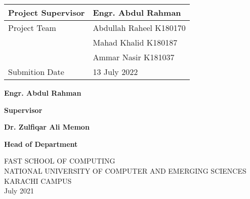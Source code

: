 \begin{titlepage}
    \begin{center}
        \vspace*{1cm}

        \begin{tabular}{ | m{5cm} | m{5cm} | }
            \hline
            Project Supervisor & \textbf{Engr. Abdul Rahman} \\ [1.5ex] 
            \hline
            Project Team & Abdullah Raheel K180170 \\ [1.5ex] 
             & Mahad Khalid K180187 \\ [1.5ex] 
             & Ammar Nasir K181037 \\ [1.5ex] 
            \hline
            Submition Date & 13 July 2022 \\ [1.5ex]
            \hline

          \end{tabular}

        \vspace{2cm}

        \Large
        \textbf{Engr. Abdul Rahman}
        \textunderscore \textunderscore \textunderscore \textunderscore \textunderscore \textunderscore \textunderscore
        \textunderscore \textunderscore \textunderscore \textunderscore \textunderscore \textunderscore \textunderscore
        \textunderscore \textunderscore \textunderscore \textunderscore \textunderscore \textunderscore \textunderscore
        \textunderscore \textunderscore \textunderscore \textunderscore \textunderscore \textunderscore \textunderscore
        \vspace{0.4cm}

        \large
        \textbf{Supervisor}
        \vspace{0.4cm}


        \vspace{2cm}

        \Large
        \textbf{Dr. Zulfiqar Ali Memon}
        \textunderscore \textunderscore \textunderscore \textunderscore \textunderscore \textunderscore \textunderscore
        \textunderscore \textunderscore \textunderscore \textunderscore \textunderscore \textunderscore \textunderscore
        \textunderscore \textunderscore \textunderscore \textunderscore \textunderscore \textunderscore \textunderscore
        \textunderscore \textunderscore \textunderscore \textunderscore \textunderscore \textunderscore \textunderscore
        \vspace{0.4cm}

        \large
        \textbf{Head of Department}
        \vspace{0.4cm}


      

        \vfill
        \normalsize
        FAST SCHOOL OF COMPUTING\\
        NATIONAL UNIVERSITY OF COMPUTER AND EMERGING SCIENCES\\
        KARACHI CAMPUS\\
        July 2021

    \end{center}
\end{titlepage}

